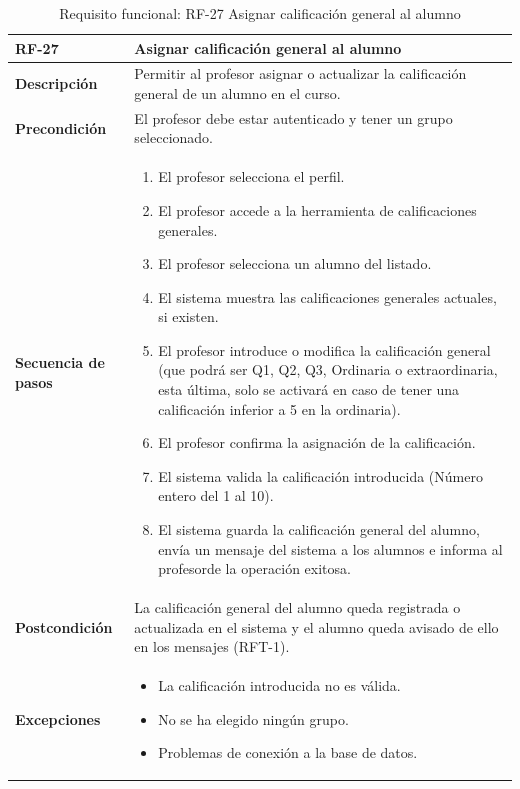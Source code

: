 \begin{table}[H]
\centering
\begin{tabularx}{\textwidth}{
  |>{\centering\arraybackslash}l
  |>{\centering\arraybackslash}X|}
\hline
\textbf{RF-27} & \textbf{Asignar calificación general al alumno} \\ \hline

\textbf{Descripción} & Permitir al profesor asignar o actualizar la calificación general de un alumno en el curso. \\ \hline

\textbf{Precondición} & El profesor debe estar autenticado y tener un grupo seleccionado. \\ \hline

\textbf{Secuencia de pasos} &
\begin{enumerate}
  \item El profesor selecciona el perfil.
  \item El profesor accede a la herramienta de calificaciones generales.
  \item El profesor selecciona un alumno del listado.
  \item El sistema muestra las calificaciones generales actuales, si existen.
  \item El profesor introduce o modifica la calificación general (que podrá ser Q1, Q2, Q3, Ordinaria o extraordinaria, esta última, solo se activará en caso de tener una calificación inferior a 5 en la ordinaria).
  \item El profesor confirma la asignación de la calificación.
  \item El sistema valida la calificación introducida (Número entero del 1 al 10).
  \item El sistema guarda la calificación general del alumno, envía un mensaje del sistema a los alumnos e informa al profesorde la operación exitosa.
\end{enumerate} \\ \hline

\textbf{Postcondición} & La calificación general del alumno queda registrada o actualizada en el sistema y el alumno queda avisado de ello en los mensajes (RFT-1). \\ \hline

\textbf{Excepciones} &
\begin{itemize}
  \item La calificación introducida no es válida.
  \item No se ha elegido ningún grupo.
  \item Problemas de conexión a la base de datos.
\end{itemize} \\ \hline
\end{tabularx}
\caption{Requisito funcional: RF-27 Asignar calificación general al alumno}
\label{tab:RF-27}
\end{table}
